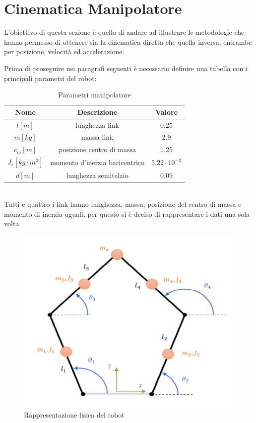 \section{Cinematica Manipolatore}
L'obiettivo di questa sezione è quello di andare ad illustrare le metodologie che hanno permesso di ottenere sia la cinematica diretta che quella inversa, entrambe per posizione, velocità ed accelerazione.
\par Prima di proseguire nei paragrafi seguenti è necessario definire una tabella con i principali parametri del robot:
\begin{table}[h!]
\centering
\begin{tabular}{|c |c |c|} 
 \hline
 Nome & Descrizione  & Valore \\ [0.5ex] 
 \hline\hline
 $l [m]$ & lunghezza link  & 0.25 \\ 
 $m [kg]$ & massa link & 2.9 \\
 $c_m [m]$ & posizione centro di massa & 1.25 \\
 $J_r [kg\cdot m^2]$ & momento d'inerzia baricentrico & $5.22\cdot 10^{-2}$ \\
 $d [m]$ & lunghezza semitelaio & 0.09 \\
 \hline
\end{tabular}
\caption{Parametri manipolatore}
\label{table:1}
\end{table}
\\Tutti e quattro i link hanno lunghezza, massa, posizione del centro di massa e momento di inerzia uguali, per questo si è deciso di rappresentare i dati una sola volta.
\begin{figure}[ht]
\begin{center}
    \includegraphics[scale=0.6]{Immagini/Robot2.png}
    \caption{Rappresentazione fisica del robot \label{fig:Robot1}}
\end{center}
\end{figure}
